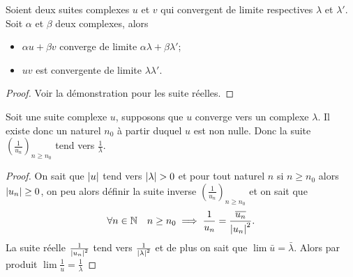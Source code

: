 \begin{prop}
  Soient deux suites complexes $u$ et $v$ qui convergent de limite respectives $\lambda$ et $\lambda'$. Soit $\alpha$ et $\beta$ deux complexes, alors
  \begin{itemize}
  \item $\alpha u + \beta v$ converge de limite $\alpha \lambda + \beta \lambda'$;
  \item $uv$ est convergente de limite $\lambda \lambda'$.
  \end{itemize}
\end{prop}
\begin{proof} Voir la démonstration pour les suite réelles.
\end{proof}
\begin{prop}
  Soit une suite complexe $u$, supposons que $u$ converge vers un complexe $\lambda$. Il existe donc un naturel $n_0$ à partir duquel $u$ est non nulle. Donc la suite $\left(\frac{1}{u_n}\right)_{n \geq n_0}$ tend vers $\frac{1}{\lambda}$.
\end{prop}
\begin{proof}
  On sait que $\left\lvert u\right\rvert$ tend vers $\left\lvert\lambda\right\rvert>0$ et pour tout naturel $n$ si $n \geq n_0$ alors $\left\lvert u_n\right\rvert \geq 0$, on peu alors définir la suite inverse $\left(\frac{1}{u_n}\right)_{n \geq n_0}$ et on sait que
  \begin{equation}
    \forall n \in \mathbb{N} \quad n \geq n_0 \implies \frac{1}{u_n}=\frac{\overline{u_n}}{\left\lvert u_n\right\rvert^2}.
  \end{equation}
La suite réelle $\frac{1}{\left\lvert u_n\right\rvert^2}$ tend vers $\frac{1}{\left\lvert\lambda\right\rvert^2}$ et de plus on sait que $\lim \bar{u}=\bar{\lambda}$. Alors par produit $\lim \frac{1}{u}=\frac{1}{\lambda}$
\end{proof}

